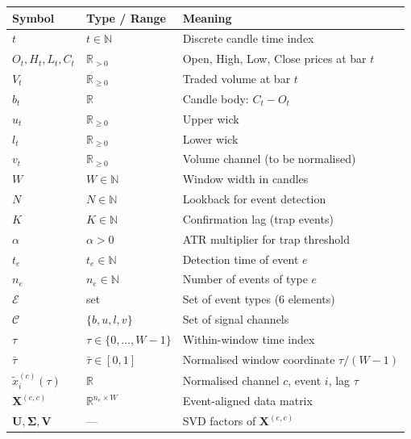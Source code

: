 \documentclass[11pt,a4paper]{article}
\theoremstyle{definition}
\theoremstyle{plain}
\newcommand{\R}{\mathbb{R}}
\newcommand{\N}{\mathbb{N}}
\newcommand{\Xmat}{\mathbf{X}}
\newcommand{\Umat}{\mathbf{U}}
\newcommand{\Smat}{\boldsymbol{\Sigma}}
\newcommand{\Vmat}{\mathbf{V}}
\begin{document}
\begin{center}
\begin{tabular}{lll}
\hline
\textbf{Symbol} & \textbf{Type / Range} & \textbf{Meaning} \\
\hline
$t$               & $t \in \N$                    & Discrete candle time index \\
$O_t, H_t, L_t, C_t$ & $\R_{>0}$              & Open, High, Low, Close prices at bar $t$ \\
$V_t$             & $\R_{\geq 0}$                 & Traded volume at bar $t$ \\
$b_t$             & $\R$                          & Candle body: $C_t - O_t$ \\
$u_t$             & $\R_{\geq 0}$                 & Upper wick \\
$l_t$             & $\R_{\geq 0}$                 & Lower wick \\
$v_t$             & $\R_{\geq 0}$                 & Volume channel (to be normalised) \\
$W$               & $W \in \N$                    & Window width in candles \\
$N$               & $N \in \N$                    & Lookback for event detection \\
$K$               & $K \in \N$                    & Confirmation lag (trap events) \\
$\alpha$          & $\alpha > 0$                  & ATR multiplier for trap threshold \\
$t_e$             & $t_e \in \N$                  & Detection time of event $e$ \\
$n_e$             & $n_e \in \N$                  & Number of events of type $e$ \\
$\mathcal{E}$     & set                           & Set of event types (6 elements) \\
$\mathcal{C}$     & $\{b, u, l, v\}$              & Set of signal channels \\
$\tau$            & $\tau \in \{0,\ldots,W-1\}$   & Within-window time index \\
$\bar{\tau}$      & $\bar{\tau} \in [0,1]$        & Normalised window coordinate $\tau/(W-1)$ \\
$\tilde{x}^{(c)}_i(\tau)$ & $\R$               & Normalised channel $c$, event $i$, lag $\tau$ \\
$\Xmat^{(e,c)}$   & $\R^{n_e \times W}$           & Event-aligned data matrix \\
$\Umat, \Smat, \Vmat$ & ---                       & SVD factors of $\Xmat^{(e,c)}$ \\

\end{tabular}
\end{center}
\end{document}
